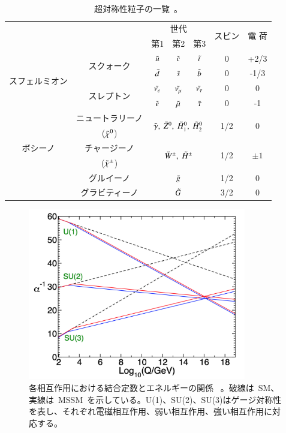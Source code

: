 \begin{table}[tbp]
	\centering
	\begin{tabular}{c|c|ccc|c|c} \hline
	& &\multicolumn{3}{c|}{世代}& \multirow{2}{*}{スピン} & \multirow{2}{*}{電 荷} \\
	& &第1&第2&第3&  &  \\ \hline
	\multirow{4}{*}{スフェルミオン} & \multirow{2}{*}{スクォーク} & $\Tilde{u}$ & $\Tilde{c}$ & $\Tilde{t}$ & 0 & +2/3 \\
	&  & $\Tilde{d}$ & $\Tilde{s}$ & $\Tilde{b}$ & 0 & -1/3 \\ \cline{2-5}
	& \multirow{2}{*}{スレプトン} & $\Tilde{\nu_e}$ & $\Tilde{\nu_{\mu}}$ & $\Tilde{\nu_{\tau}}$ & 0 & 0 \\
	&  & $\Tilde{e}$ & $\Tilde{\mu}$ & $\Tilde{\tau}$ & 0 & -1 \\ \hline\hline
	\multirow{5}{*}{ボシーノ} & ニュートラリーノ& \multicolumn{3}{c|}{\multirow{2}{*}{$\Tilde{\gamma},~\Tilde{Z}^0,~\Tilde{H}^{0}_1,~\Tilde{H}^{0}_2$}}& \multirow{2}{*}{1/2} & \multirow{2}{*}{0} \\
	&~($\Tilde{\chi}^0$)~&  &  & & & \\ \cline{2-5}
	& チャージーノ& \multicolumn{3}{c|}{\multirow{2}{*}{$\Tilde{W}^{\pm},~\Tilde{H}^{\pm}$}} & \multirow{2}{*}{1/2} & \multirow{2}{*}{$\pm1$} \\
	& ~($\Tilde{\chi}^{\pm}$)~ & &&&& \\ \cline{2-5}
	& グルイーノ & \multicolumn{3}{c|}{$\Tilde{g}$} & 1/2 & 0 \\ \cline{2-5}
	& グラビティーノ & \multicolumn{3}{c|}{$\Tilde{G}$} & 3/2 & 0 \\ \hline
	\end{tabular}
	\caption[超対称性粒子の一覧]{超対称性粒子の一覧~\cite{AR:12}。}
	\label{tb:SUSY}
\end{table}

\begin{figure}[tbp]
        \centering   
        \includegraphics[width=0.85\textwidth]{img/pdf/gut.png}
        \caption[各相互作用における結合定数とエネルギーの関係]{各相互作用における結合定数とエネルギーの関係~\cite{AR:01} 。破線は~SM、実線は~MSSM~を示している。U(1)、SU(2)、SU(3)はゲージ対称性を表し、それぞれ電磁相互作用、弱い相互作用、強い相互作用に対応する。}
        \label{fig:GUT}
\end{figure}

